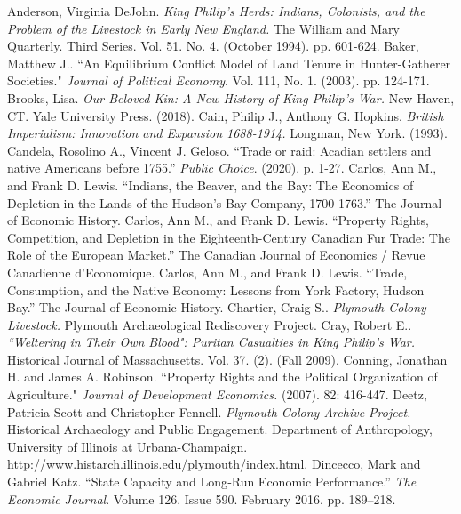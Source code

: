 \documentclass[11pt, oneside]{article}
\begin{document}
\begin{thebibliography}{1}
 Anderson, Virginia DeJohn. {\em King Philip's Herds: Indians, Colonists, and the Problem of the Livestock in Early New England.} The William and Mary Quarterly. Third Series. Vol. 51. No. 4. (October 1994). pp. 601-624.
\smallskip
 Baker, Matthew J.. ``An Equilibrium Conflict Model of Land Tenure in Hunter-Gatherer Societies." {\em Journal of Political Economy}. Vol. 111, No. 1. (2003). pp. 124-171.
\smallskip
{} Brooks, Lisa. {\em Our Beloved Kin: A New History of King Philip's War.}  New Haven, CT. Yale University Press. (2018).
\smallskip
{} Cain, Philip J., Anthony G. Hopkins. {\em British Imperialism:  Innovation and Expansion 1688-1914.}  Longman, New York. (1993).
\smallskip
{} Candela, Rosolino A., Vincent J. Geloso. ``Trade or raid: Acadian settlers and native Americans before 1755.'' {\em Public Choice}. (2020). p. 1-27.
\smallskip
{} Carlos, Ann M., and Frank D. Lewis. “Indians, the Beaver, and the Bay: The Economics of Depletion in the Lands of the Hudson’s Bay Company, 1700-1763.” The Journal of Economic History.
\smallskip
{} Carlos, Ann M., and Frank D. Lewis. “Property Rights, Competition, and Depletion in the Eighteenth-Century Canadian Fur Trade: The Role of the European Market.” The Canadian Journal of Economics / Revue Canadienne d’Economique.
\smallskip
{} Carlos, Ann M., and Frank D. Lewis. “Trade, Consumption, and the Native Economy: Lessons from York Factory, Hudson Bay.” The Journal of Economic History.
\smallskip
{} Chartier, Craig S.. {\em Plymouth Colony Livestock.}  Plymouth Archaeological Rediscovery Project.
\smallskip
{} Cray, Robert E.. {\em ``Weltering in Their Own Blood": Puritan Casualties in King Philip's War.} Historical Journal of Massachusetts. Vol. 37. (2). (Fall 2009).
\smallskip
{} Conning, Jonathan H. and James A. Robinson. ``Property Rights and the Political Organization of Agriculture."  {\em Journal of Development Economics.}  (2007). 82:  416-447.
 Deetz, Patricia Scott and Christopher Fennell. {\em Plymouth Colony Archive Project.}  Historical Archaeology and Public Engagement. Department of Anthropology, University of Illinois at Urbana-Champaign. \url{http://www.histarch.illinois.edu/plymouth/index.html}.
\smallskip
{} Dincecco, Mark and Gabriel Katz. ``State Capacity and Long‐Run Economic Performance.'' {\em The Economic Journal}. Volume 126. Issue 590. February 2016. pp. 189–218.

\end{thebibliography}
\end{document}
